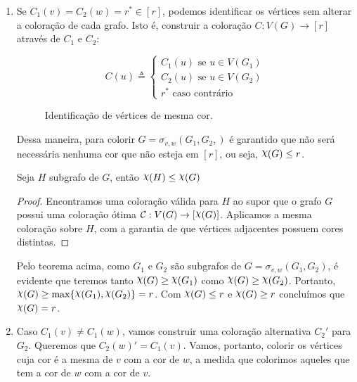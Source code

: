 \documentclass{homework}
\begin{document}
	\begin{enumerate}[label=\Roman*.]
		\item Se $C_1(v) = C_2(w) = r^{\ast} \in [r]$, podemos identificar os vértices sem alterar a coloração de cada grafo. Isto é, construir a coloração $C : V(G) \to [r]$ através de $C_1$ e $C_2$: \par
		
		$$C(u) \triangleq \begin{cases}
		C_1(u) \text{ se } u \in V(G_1)\\
		C_2(u) \text{ se } u \in V(G_2)\\
		r^{\ast} \text{ caso contrário}
		\end{cases}$$
		
		\begin{figure}[H]
			\centering
			
			\caption{Identificação de vértices de mesma cor.}
			\label{fig:2.2}
		\end{figure}
		
		Dessa maneira, para colorir $G = \sigma_{v, w}(G_1, G_2,)$ é garantido que não será necessária nenhuma cor que não esteja em $[r]$, ou seja, $\rchi(G) \le r$. \par
		
		\begin{theorem}
		Seja $H$ subgrafo de $G$, então $\rchi(H) \le \rchi(G)$
		\end{theorem}
		
		\begin{proof}
		Encontramos uma coloração válida para $H$ ao supor que o grafo $G$ possui uma coloração ótima $ \mathcal{C} : V(G) \to [\rchi(G)] $. Aplicamos a mesma coloração sobre $H$, com a garantia de que vértices adjacentes possuem cores distintas. 
		\end{proof}
	
		Pelo teorema acima, como $G_1$ e $G_2$ são subgrafos de $G = \sigma_{v, w}(G_1, G_2)$, é evidente que teremos tanto $\rchi(G) \ge \rchi(G_1)$ como $\rchi(G) \ge \rchi(G_2)$. Portanto, $\rchi(G) \ge \max\{\rchi(G_1), \rchi(G_2)\} = r$. Com $\rchi(G) \le r$ e $\rchi(G) \ge r$ concluímos que $\rchi(G) = r$.
	
		\item Caso $C_1(v) \neq C_1(w)$, vamos construir uma coloração alternativa $C_2'$ para $G_2$. Queremos que $C_2(w)' = C_1(v)$. Vamos, portanto, colorir os vértices cuja cor é a mesma de $v$ com a cor de $w$, a medida que colorimos aqueles que tem a cor de $w$ com a cor de $v$. \par
		

\end{enumerate}
\end{document}
